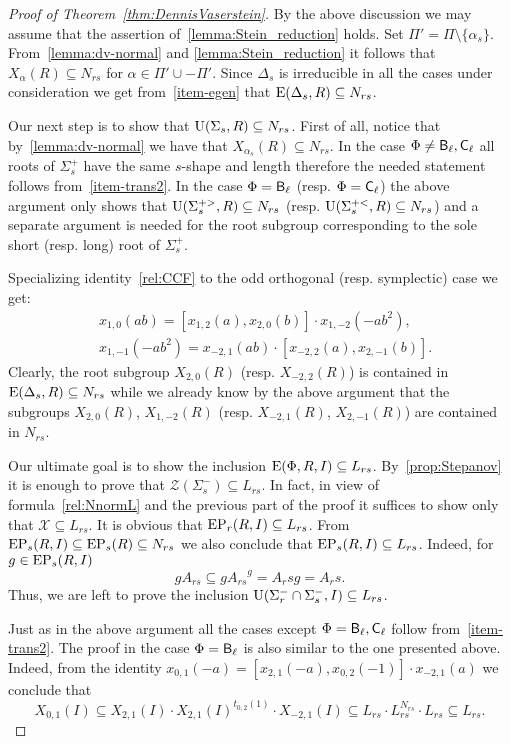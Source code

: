 \begin{proof}[Proof of Theorem~\ref{thm:DennisVaserstein}]
By the above discussion we may assume that the assertion of~\cref{lemma:Stein_reduction} holds.
Set $\Pi' = \Pi \setminus \{\alpha_s\}$.
From~\cref{lemma:dv-normal} and \cref{lemma:Stein_reduction} it follows that $X_\alpha(R) \subseteq N_{rs}$ for $\alpha \in \Pi' \cup -\Pi'$.
Since $\Delta_s$ is irreducible in all the cases under consideration we get from~\cref{item-egen} that $\operatorname{E}(\Delta_s, R) \subseteq N_{rs}$.

Our next step is to show that $\operatorname{U}(\Sigma_s, R) \subseteq N_{rs}$.
First of all, notice that by~\cref{lemma:dv-normal} we have that $X_{\alpha_s}(R) \subseteq N_{rs}$.
In the case $\Phi\neq \mathsf{B}_\ell, \mathsf{C}_\ell$ all roots of $\Sigma^+_s$ have the same $s$-shape and length therefore the needed statement follows from~\cref{item-trans2}.
In the case $\Phi=\mathsf{B}_\ell$ (resp. $\Phi=\mathsf{C}_\ell$) the above argument only shows that $\operatorname{U}(\Sigma_s^{+>}, R) \subseteq N_{rs}$ (resp. $\operatorname{U}(\Sigma_s^{+<}, R) \subseteq N_{rs}$)
and a separate argument is needed for the root subgroup corresponding to the sole short (resp. long) root of $\Sigma_s^+$.
 
Specializing identity~\eqref{rel:CCF} to the odd orthogonal (resp. symplectic) case we get:
\begin{align*} \label{rel:CCF-specBC}
& x_{1,0}(ab) = [x_{1, 2}(a), x_{2, 0}(b)] \cdot x_{1,-2}(-a b^2), \\
& x_{1,-1}(-ab^2) = x_{-2,1}(ab) \cdot [x_{-2, 2}(a), x_{2, -1}(b)].
\end{align*}
Clearly, the root subgroup $X_{2, 0}(R)$ (resp. $X_{-2,2}(R)$) is contained in $\operatorname{E}(\Delta_s, R) \subseteq N_{rs}$ while we already know by the above argument that the subgroups $X_{2, 0}(R)$, $X_{1,-2}(R)$
(resp. $X_{-2,1}(R)$, $X_{2,-1}(R)$) are contained in $N_{rs}$.

Our ultimate goal is to show the inclusion $\operatorname{E}(\Phi, R, I) \subseteq L_{rs}$. 
By~\cref{prop:Stepanov} it is enough to prove that $\mathcal{Z}(\Sigma^-_s) \subseteq L_{rs}$.
In fact, in view of formula~\eqref{rel:NnormL} and the previous part of the proof it suffices to show only that $\mathcal{X} \subseteq L_{rs}$.
It is obvious that $\operatorname{EP}_r(R, I) \subseteq L_{rs}$.
From $\operatorname{EP}_s(R, I) \subseteq \operatorname{EP}_s(R) \subseteq N_{rs}$ we also conclude that $\operatorname{EP}_s(R, I) \subseteq L_{rs}$. Indeed, for $g\in\operatorname{EP}_s(R,I)$
\[ gA_{rs} \subseteq g {A_{rs}}^g = A_rs g = A_rs. \]
Thus, we are left to prove the inclusion $\operatorname{U}(\Sigma^-_r \cap \Sigma^-_s, I) \subseteq L_{rs}$.

Just as in the above argument all the cases except $\Phi = \mathsf{B}_\ell, \mathsf{C}_\ell$ follow from~\cref{item-trans2}.
The proof in the case $\Phi=\mathsf{B}_\ell$ is also similar to the one presented above.
Indeed, from the identity $x_{0, 1}(-a) = [x_{2,1}(-a), x_{0, 2}(-1)]\cdot x_{-2,1}(a)$ we conclude that
$$X_{0,1}(I) \subseteq X_{2,1}(I) \cdot X_{2,1}(I)^{t_{0,2}(1)} \cdot X_{-2,1}(I) \subseteq L_{rs} \cdot L_{rs}^{N_{rs}} \cdot L_{rs} \subseteq L_{rs}.$$

\end{proof}
